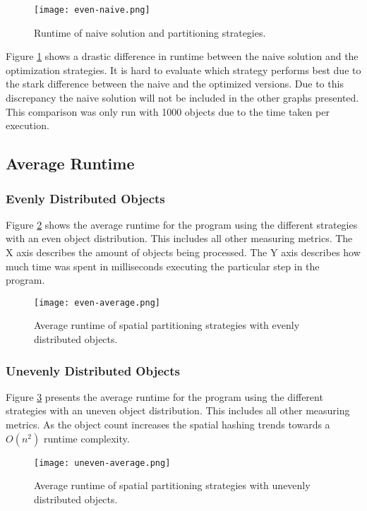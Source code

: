 \documentclass[a4paper, 12pt]{article}
\begin{document}
\begin{figure}[H]
    \centering
    \texttt{[image: even-naive.png]}
    \caption{Runtime of naive solution and partitioning strategies.}
    \label{fig:naive}
\end{figure}

Figure \ref{fig:naive} shows a drastic difference in runtime between the naive
solution and the optimization strategies. It is hard to evaluate which strategy
performs best due to the stark difference between the naive and the optimized
versions. Due to this discrepancy the naive solution will not be included in the
other graphs presented. This comparison was only run with 1000 objects due to
the time taken per execution.

\subsection{Average Runtime}

\subsubsection{Evenly Distributed Objects}
Figure \ref{fig:even-average} shows the average runtime for the program
using the different strategies with an even object distribution. This includes
all other measuring metrics. The X axis describes the amount of objects being
processed. The Y axis describes how much time was spent in milliseconds
executing the particular step in the program.

\begin{figure}[H]
    \centering
    \texttt{[image: even-average.png]}
    \caption{Average runtime of spatial partitioning strategies with evenly
    distributed objects.}
    \label{fig:even-average}
\end{figure}

\subsubsection{Unevenly Distributed Objects}
Figure \ref{fig:uneven-average} presents the average runtime for the program
using the different strategies with an uneven object distribution. This includes
all other measuring metrics. As the object count increases the spatial hashing
trends towards a $O(n^2)$ runtime complexity.
\begin{figure}[H]
    \centering
    \texttt{[image: uneven-average.png]}
    \caption{Average runtime of spatial partitioning strategies with unevenly
    distributed objects.}
    \label{fig:uneven-average}
\end{figure}
\end{document}
